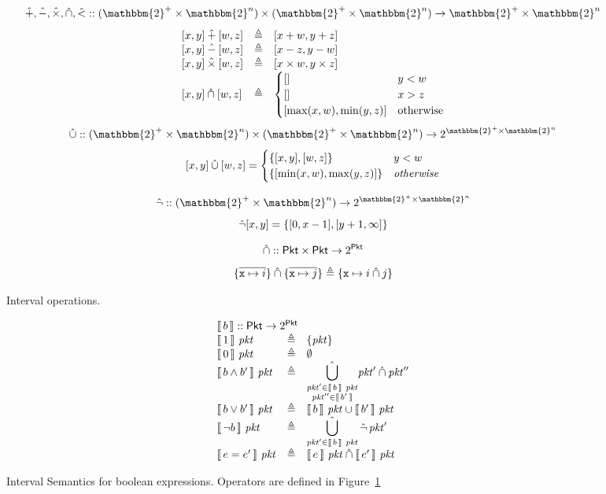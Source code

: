 \begin{figure}
  \[
    \iplus,\iminus,\itimes,\icap,\ilt :: (\mathbbm{2}^+ \times \mathbbm{2}^n) \times (\mathbbm{2}^+ \times \mathbbm{2}^n) \to \mathbbm{2}^+ \times \mathbbm{2}^n\]
  \[\begin{array}{lcl}
      {[x,y]} \mathbin{\hat+} [w,z] &\triangleq & [x + w, y + z] \\
      {[x,y]} \mathbin{\hat{-}} [w,z] &\triangleq & [x - z, y - w] \\
      {[x,y]} \mathbin{\hat{\times}} [w,z] & \triangleq & [x \times w, y \times z] \\
      {[x,y]} \mathbin{\hat{\cap}} [w,z] & \triangleq & \begin{cases}
        [] &y < w\\
        [] &x > z \\
        [\max(x,w), \min(y,z)] &\mathrm{otherwise}
      \end{cases} 
    \end{array}
  \]
  \[\icup :: (\mathbbm{2}^+ \times \mathbbm{2}^n) \times (\mathbbm{2}^+ \times \mathbbm{2}^n) \to 2^{\mathbbm{2}^+ \times \mathbbm{2}^n}\]
  \[[x,y] \mathbin{\hat{\cup}} [w,z] = \begin{cases}
      \{[x,y],[w,z]\} & y < w \\
      \{[\min(x,w), \max(y,z)]\} & \mathit{otherwise}
    \end{cases}\]
    
  
  \[\ineg :: (\mathbbm{2}^+ \times \mathbbm{2}^n) \to 2^{\mathbbm{2}^+
      \times \mathbbm{2}^n}\]
  \[\mathop{\hat{\neg}} [x,y] = \{[0,x-1],[y+1,\infty]\} \]
  
  \[\mathbin{\hat{\cap}} :: \mathsf{Pkt} \times \mathsf{Pkt} \to 2^{\mathsf{Pkt}}\]
  \[\{\overline{\texttt{x} \mapsto i}\} \mathbin{\hat{\cap}} \{\overline{\texttt{x} \mapsto j}\} \triangleq \{\texttt{x} \mapsto i \mathbin{\hat{\cap}} j\}\]

  \caption{Interval operations. }
  \label{fig:ivaloperators}
\end{figure}

\begin{figure}
  \[
    \begin{array}{lcl}
      \multicolumn 3 l {\bracbb{b} :: \Pkt \to 2^\Pkt} \\
      \bracbb{1}~\pkt &\triangleq& \{\pkt\}\\
      \bracbb{0}~\pkt & \triangleq & \emptyset \\
      \bracbb{b \wedge b'}~\pkt &\triangleq & \displaystyle \hat{\bigcup_{\substack{\pkt' \in \bracbb{b}~\pkt\\ \pkt'' \in \bracbb{b'}}}} \pkt' \icap \pkt''\\
      \bracbb{b \vee b'}~\pkt & \triangleq & \bracbb{b}~\pkt \cup \bracbb{b'}~\pkt \\
      \bracbb{\neg b}~\pkt & \triangleq & \displaystyle \hat{\bigcup_{\pkt' \in \bracbb{b}~\pkt}}\ineg \pkt'\\
      \bracbb{e = e'}~\pkt & \triangleq & \bracbb{e}~\pkt \icap \bracbb{e'}~\pkt
    \end{array}
  \]
  \caption{Interval Semantics for boolean expressions. Operators are
    defined in Figure~\ref{fig:ivaloperators}}
  \label{fig:expr_semantics}
\end{figure}
